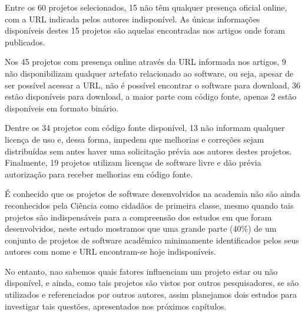 Entre os 60 projetos selecionados, 15 não têm qualquer presença oficial online,
com a URL indicada pelos autores indisponível. As únicas informações
disponíveis destes 15 projetos são aquelas encontradas nos artigos onde foram
publicados.

Nos 45 projetos com presença online através da URL informada nos artigos, 9 não
disponibilizam qualquer artefato relacionado ao software, ou seja, apesar de
ser possível acessar a URL, não é possível encontrar o software para download,
36 estão disponíveis para download, a maior parte com código fonte, apenas 2
estão disponíveis em formato binário.

Dentre os 34 projetos com código fonte disponível, 13 não informam qualquer
licença de uso e, dessa forma, impedem que melhorias e correções
sejam distribuídas sem antes haver uma solicitação prévia aos autores destes
projetos. Finalmente, 19 projetos utilizam licenças de software livre e dão
prévia autorização para receber melhorias em código fonte.

É conhecido que os projetos de software desenvolvidos na academia não são ainda
reconhecidos pela Ciência como cidadãos de primeira classe, mesmo quando tais
projetos são indispensáveis para a compreensão dos estudos em que foram
desenvolvidos, neste estudo mostramos que uma grande parte (40\%) de um
conjunto de projetos de software acadêmico minimamente identificados pelos seus
autores com nome e URL encontram-se hoje indisponíveis.

No entanto, nao sabemos quais fatores influenciam um projeto estar ou não
disponível, e ainda, como tais projetos são vistos por outros pesquisadores, se
são utilizados e referenciados por outros autores, assim planejamos dois
estudos para investigar tais questões, apresentados nos próximos capítulos.



